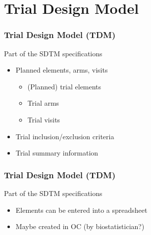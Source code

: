 \documentclass{beamer}
\begin{document}

\section{Trial Design Model}

\begin{frame}
  \frametitle{Trial Design Model (TDM)}

  Part of the SDTM specifications

  \begin{itemize}
	  \item Planned elements, arms, visits
	  \begin{itemize}
  		\item (Planned) trial elements
  		\item Trial arms
  		\item Trial visits
	  \end{itemize}
	  \item Trial inclusion/exclusion criteria
	  \item Trial summary information
  \end{itemize}
\end{frame}

\begin{frame}
  \frametitle{Trial Design Model (TDM)}

  Part of the SDTM specifications

  \begin{itemize}
	  \item Elements can be entered into a spreadsheet
      \item Maybe created in OC (by biostatistician?)
  \end{itemize}
\end{frame}


%
%
 
\end{document}
